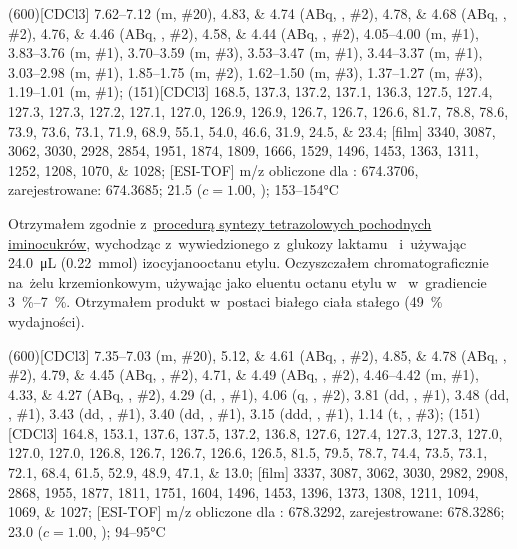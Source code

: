 \begin{fullexp}
	\NMR(600)[CDCl3] \numrange{7.62}{7.12} (m, \#{20}), \numlist{4.83;4.74} (ABq, , \#{2}), \numlist{4.78;4.68} (ABq, , \#{2}), \numlist{4.76;4.46} (ABq, , \#{2}), \numlist{4.58;4.44} (ABq, , \#{2}), \numrange{4.05}{4.00} (m, \#{1}), \numrange{3.83}{3.76} (m, \#{1}), \numrange{3.70}{3.59} (m, \#{3}), \numrange{3.53}{3.47} (m, \#{1}), \numrange{3.44}{3.37} (m, \#{1}), \numrange{3.03}{2.98} (m, \#{1}), \numrange{1.85}{1.75} (m, \#{2}), \numrange{1.62}{1.50} (m, \#{3}), \numrange{1.37}{1.27} (m, \#{3}), \numrange{1.19}{1.01} (m, \#{1});
	(151)[CDCl3] \numlist{168.5; 137.3; 137.2; 137.1; 136.3; 127.5; 127.4; 127.3; 127.3; 127.2; 127.1; 127.0; 126.9; 126.9; 126.7; 126.7; 126.6; 81.7; 78.8; 78.6; 73.9; 73.6; 73.1; 71.9; 68.9; 55.1; 54.0; 46.6; 31.9; 24.5; 23.4};
	[film] \numlist{3340; 3087; 3062; 3030; 2928; 2854; 1951; 1874; 1809; 1666; 1529; 1496; 1453; 1363; 1311; 1252; 1208; 1070; 1028};
	[ESI-TOF] m/z obliczone dla : \num{674.3706}, zarejestrowane: \num{674.3685};
	\data{[$\alpha^{23}_D$]~$=$} \num{21.5} ($c = 1.00$, );
	 \numrange{153}{154}\si{\celsius}
\end{fullexp}

Otrzymałem zgodnie z~\hyperref[experimental:sugars:schwartz]{procedurą syntezy tetrazolowych
	pochodnych iminocukrów}, wychodząc z~wywiedzionego z~glukozy laktamu~
	i~używając \SI{24.0}{\micro\liter} (\SI{0.22}{\milli\mol}) izocyjanooctanu etylu.
Oczyszczałem chromatograficznie na~żelu krzemionkowym,
	używając jako eluentu octanu etylu w~ w~gradiencie \SIrange{3}{7}{\percent}.
Otrzymałem produkt w~postaci białego ciała stałego (\SI{49}{\percent} wydajności).

\begin{fullexp}
	\NMR(600)[CDCl3] \numrange{7.35}{7.03} (m, \#{20}), \numlist{5.12;4.61} (ABq, , \#{2}), \numlist{4.85;4.78} (ABq, , \#{2}), \numlist{4.79;4.45} (ABq, , \#{2}), \numlist{4.71;4.49} (ABq, , \#{2}), \numrange{4.46}{4.42} (m, \#{1}), \numlist{4.33;4.27} (ABq, , \#{2}), \num{4.29} (d, , \#{1}), \num{4.06} (q, , \#{2}), \num{3.81} (dd, , \#{1}), \num{3.48} (dd, , \#{1}), \num{3.43} (dd, , \#{1}), \num{3.40} (dd, , \#{1}), \num{3.15} (ddd, , \#{1}), \num{1.14} (t, , \#{3});
	(151)[CDCl3] \numlist{164.8; 153.1; 137.6; 137.5; 137.2; 136.8; 127.6; 127.4; 127.3; 127.3; 127.0; 127.0; 127.0; 126.8; 126.7; 126.7; 126.6; 126.5; 81.5; 79.5; 78.7; 74.4; 73.5; 73.1; 72.1; 68.4; 61.5; 52.9; 48.9; 47.1; 13.0};
	[film] \numlist{3337; 3087; 3062; 3030; 2982; 2908; 2868; 1955; 1877; 1811; 1751; 1604; 1496; 1453; 1396; 1373; 1308; 1211; 1094; 1069; 1027};
	[ESI-TOF] m/z obliczone dla : \num{678.3292}, zarejestrowane: \num{678.3286};
	\data{[$\alpha^{23}_D$]~$=$} \num{23.0} ($c = 1.00$, );
	 \numrange{94}{95}\si{\celsius}
\end{fullexp}

